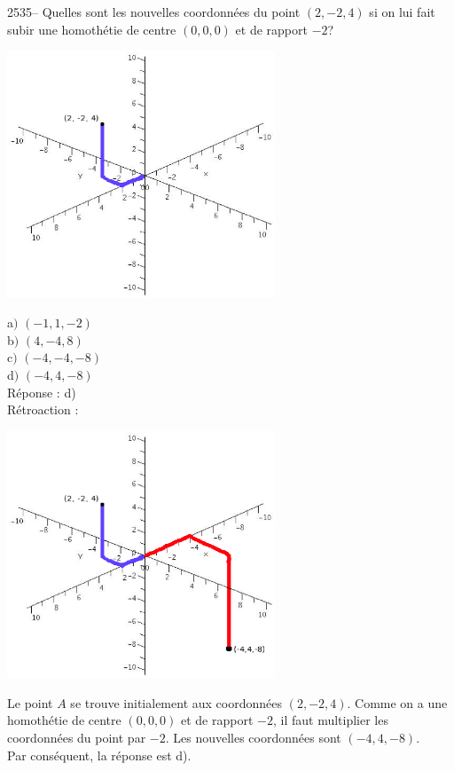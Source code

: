 \documentclass[letterpaper, 12pt]{article}
\begin{document}
2535-- Quelles sont les nouvelles coordonn\'ees du point $(2, -2, 4)$ si on lui fait subir une homoth\'etie de centre $(0, 0, 0)$ et de rapport $-2$? \\
\begin{center}
 \includegraphics[width=8cm,bb=14 14 614 602]{Q2535.eps}
\end{center}
a$)$ $(-1, 1, -2)$\\
b$)$ $(4, -4, 8)$\\
c$)$ $(-4, -4, -8)$\\
d$)$ $(-4, 4, -8)$\\

R\'eponse : d)\\

R\'etroaction :\\
\begin{center}
 \includegraphics[width=8cm,bb=14 14 614 602]{Q2535r.eps}
\end{center}
Le point $A$ se trouve initialement aux coordonn\'ees $(2, -2, 4)$. Comme on a une homoth\'etie de centre \mbox{$(0, 0, 0)$} et de rapport $-2$, il faut multiplier les coordonn\'ees du point par $-2$. Les nouvelles coordonn\'ees sont $(-4, 4, -8)$.\\
Par cons\'equent, la r\'eponse est d).\\
\end{document}
